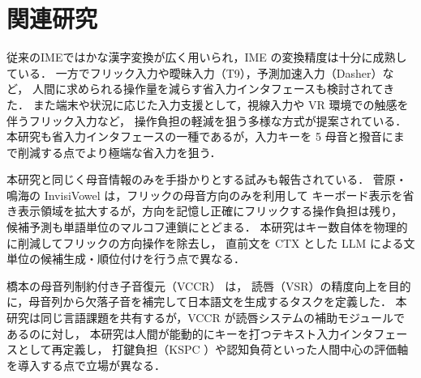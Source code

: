 \section{関連研究}

従来のIMEではかな漢字変換が広く用いられ，IME の変換精度は十分に成熟している．
一方でフリック入力や曖昧入力（T9），予測加速入力（Dasher）など，
人間に求められる操作量を減らす省入力インタフェースも検討されてきた．
また端末や状況に応じた入力支援として，視線入力\cite{murata2009gaze}や
VR 環境での触感を伴うフリック入力\cite{kiyohara2022vrflick}など，
操作負担の軽減を狙う多様な方式が提案されている．
本研究も省入力インタフェースの一種であるが，入力キーを 5 母音と撥音にまで削減する点でより極端な省入力を狙う．

本研究と同じく母音情報のみを手掛かりとする試みも報告されている．
菅原・鳴海の InvisiVowel\cite{sugawara2023invisivowel} は，フリックの母音方向のみを利用して
キーボード表示を省き表示領域を拡大するが，方向を記憶し正確にフリックする操作負担は残り，
候補予測も単語単位のマルコフ連鎖にとどまる．
本研究はキー数自体を物理的に削減してフリックの方向操作を除去し，
直前文を CTX とした LLM による文単位の候補生成・順位付けを行う点で異なる．

橋本の母音列制約付き子音復元（VCCR）\cite{hashimoto2026vccr} は，
読唇（VSR）の精度向上を目的に，母音列から欠落子音を補完して日本語文を生成するタスクを定義した．
本研究は同じ言語課題を共有するが，VCCR が読唇システムの補助モジュールであるのに対し，
本研究は人間が能動的にキーを打つテキスト入力インタフェースとして再定義し，
    打鍵負担（KSPC \cite{mackenzie2002kspc}）や認知負荷といった人間中心の評価軸を導入する点で立場が異なる．  %
